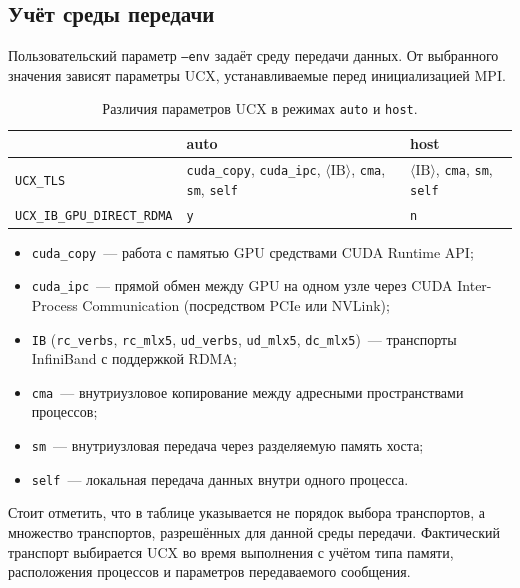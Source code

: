 \documentclass[a4paper,14pt]{extarticle}
\begin{document}
\subsection{Учёт среды передачи}
\label{sec:transport-env-impl}

Пользовательский параметр \texttt{--env} задаёт среду передачи данных. От выбранного значения зависят параметры UCX, устанавливаемые перед инициализацией MPI.

\begin{table}[h]
	\centering
	\footnotesize
	\renewcommand{\arraystretch}{1.2}
	\begin{tabularx}{\textwidth}{@{}l X X@{}}
		\hline
		& \textbf{auto} & \textbf{host} \\
		\hline
		\texttt{UCX\_TLS} & \texttt{cuda\_copy}, \texttt{cuda\_ipc}, $\langle\text{IB}\rangle$, \texttt{cma}, \texttt{sm}, \texttt{self} & $\langle\text{IB}\rangle$, \texttt{cma}, \texttt{sm}, \texttt{self} \\
		\texttt{UCX\_IB\_GPU\_DIRECT\_RDMA} & \texttt{y} & \texttt{n} \\
		\hline
	\end{tabularx}
	\caption{Различия параметров UCX в режимах \texttt{auto} и \texttt{host}.}
	\label{tab:ucx-modes}
\end{table}

\begin{itemize}[leftmargin=2.1cm, itemsep=0.1em, topsep=0.1em]
	\item \texttt{cuda\_copy}~--- работа с памятью GPU средствами CUDA Runtime API;
	\item \texttt{cuda\_ipc}~--- прямой обмен между GPU на одном узле через CUDA Inter-Process Communication (посредством PCIe или NVLink);
	\item \texttt{IB} (\texttt{rc\_verbs}, \texttt{rc\_mlx5}, \texttt{ud\_verbs}, \texttt{ud\_mlx5}, \texttt{dc\_mlx5})~--- транспорты InfiniBand с поддержкой RDMA;
	\item \texttt{cma}~--- внутриузловое копирование между адресными пространствами процессов;
	\item \texttt{sm}~--- внутриузловая передача через разделяемую память хоста;
	\item \texttt{self}~--- локальная передача данных внутри одного процесса.
\end{itemize}

Стоит отметить, что в таблице указывается не порядок выбора транспортов, а множество транспортов, разрешённых для данной среды передачи. Фактический транспорт выбирается UCX во время выполнения с учётом типа памяти, расположения процессов и параметров передаваемого сообщения.
\end{document}
